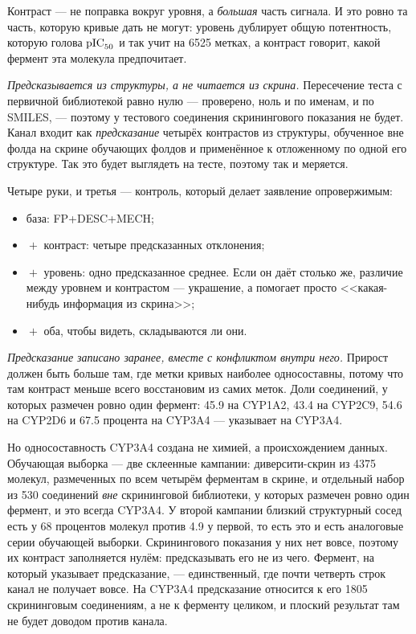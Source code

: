 Контраст --- не поправка вокруг уровня, а \emph{большая} часть сигнала. И это ровно та часть,
которую кривые дать не могут: уровень дублирует общую потентность, которую голова $\mathrm{pIC}_{50}$ и так
учит на 6525 метках, а контраст говорит, какой фермент эта молекула предпочитает.

\emph{Предсказывается из структуры, а не читается из скрина.} Пересечение теста с первичной
библиотекой равно нулю --- проверено, ноль и по именам, и по SMILES, --- поэтому у тестового
соединения скринингового показания не будет. Канал входит как \emph{предсказание} четырёх
контрастов из структуры, обученное вне фолда на скрине обучающих фолдов и применённое к
отложенному по одной его структуре. Так это будет выглядеть на тесте, поэтому так и меряется.

Четыре руки, и третья --- контроль, который делает заявление опровержимым:

\begin{itemize}
\item база: FP+DESC+MECH;
\item ${}+{}$ контраст: четыре предсказанных отклонения;
\item ${}+{}$ уровень: одно предсказанное среднее. Если он даёт столько же, различие между
      уровнем и контрастом --- украшение, а помогает просто <<какая-нибудь информация из
      скрина>>;
\item ${}+{}$ оба, чтобы видеть, складываются ли они.
\end{itemize}

\emph{Предсказание записано заранее, вместе с конфликтом внутри него.} Прирост должен быть
больше там, где метки кривых наиболее односоставны, потому что там контраст меньше всего
восстановим из самих меток. Доли соединений, у которых размечен ровно один фермент: 45.9 на
CYP1A2, 43.4 на CYP2C9, 54.6 на CYP2D6 и 67.5 процента на CYP3A4 --- указывает на CYP3A4.

Но односоставность CYP3A4 создана не химией, а происхождением данных. Обучающая выборка ---
две склеенные кампании: диверсити-скрин из 4375 молекул, размеченных по всем четырём ферментам
в скрине, и отдельный набор из 530 соединений \emph{вне} скрининговой библиотеки, у которых
размечен ровно один фермент, и это всегда CYP3A4. У второй кампании близкий структурный сосед
есть у 68 процентов молекул против 4.9 у первой, то есть это и есть аналоговые серии обучающей
выборки. Скринингового показания у них нет вовсе, поэтому их контраст заполняется нулём:
предсказывать его не из чего. Фермент, на который указывает предсказание, --- единственный, где
почти четверть строк канал не получает вовсе. На CYP3A4 предсказание относится к его 1805
скрининговым соединениям, а не к ферменту целиком, и плоский результат там не будет доводом
против канала.

